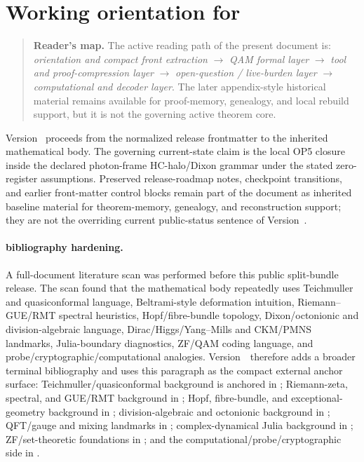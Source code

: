 \section*{Working orientation for \docversion}
\begin{quote}\small
\noindent\textbf{Reader's map.} The active reading path of the present document is: \emph{orientation and compact front extraction} $\to$ \emph{QAM formal layer} $\to$ \emph{tool and proof-compression layer} $\to$ \emph{open-question / live-burden layer} $\to$ \emph{computational and decoder layer}. The later appendix-style historical material remains available for proof-memory, genealogy, and local rebuild support, but it is not the governing active theorem core.
\end{quote}
Version~\docversion{} proceeds from the normalized release frontmatter to the inherited mathematical body. The governing current-state claim is the local OP5 closure inside the declared photon-frame HC-halo/Dixon grammar under the stated zero-register assumptions. Preserved release-roadmap notes, checkpoint transitions, and earlier front-matter control blocks remain part of the document as inherited baseline material for theorem-memory, genealogy, and reconstruction support; they are not the overriding current public-status sentence of Version~\docversion{}.

\paragraph{bibliography hardening.}
A full-document literature scan was performed before this public split-bundle release. The scan found that the mathematical body repeatedly uses Teichmuller and quasiconformal language, Beltrami-style deformation intuition, Riemann--GUE/RMT spectral heuristics, Hopf/fibre-bundle topology, Dixon/octonionic and division-algebraic language, Dirac/Higgs/Yang--Mills and CKM/PMNS landmarks, Julia-boundary diagnostics, ZF/QAM coding language, and probe/cryptographic/computational analogies. Version~\docversion\ therefore adds a broader terminal bibliography and uses this paragraph as the compact external anchor surface: Teichmuller/quasiconformal background is anchored in \cite{Ahlfors2006,GardinerLakic2000,Hubbard2006,Sullivan1985}; Riemann-zeta, spectral, and GUE/RMT background in \cite{Riemann1859,Edwards1974,Titchmarsh1986,Conrey2003,Montgomery1973,Odlyzko1987,Mehta2004,KatzSarnak1999}; Hopf, fibre-bundle, and exceptional-geometry background in \cite{Hopf1931,Steenrod1951,Hatcher2002,Bryant1987,EguchiGilkeyHanson1980}; division-algebraic and octonionic background in \cite{Baez2002,Dixon1994,Furey2018}; QFT/gauge and mixing landmarks in \cite{Dirac1928,YangMills1954,EnglertBrout1964,Higgs1964,Cabibbo1963,KobayashiMaskawa1973,MakiNakagawaSakata1962}; complex-dynamical Julia background in \cite{Milnor2006}; ZF/set-theoretic foundations in \cite{Zermelo1908,Fraenkel1928,Jech2003,Kunen1980}; and the computational/probe/cryptographic side in \cite{Turing1936,Kasiski1863,RivestShamirAdleman1978,DiffieHellman1976,Norris1997,Glasserman2004,Bollerslev1986,Knuth1997,Rojas1998,Copeland2006}.

